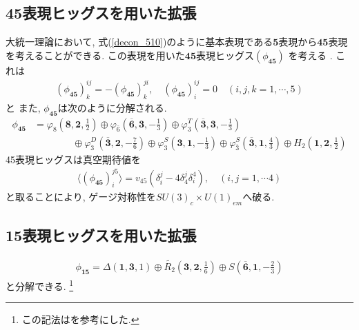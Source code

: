 \subsection{45表現ヒッグスを用いた拡張}
大統一理論において, 式(\ref{decon_510})のように基本表現である$\bm{5}$表現から$\bm{45}$表現を考えることができる.
この表現を用いた$\bm{45}$表現ヒッグス$(\phi_{\bm{45}})$ を考える
\cite{framptonEstimateFlavorNumber1979,georgiNewLeptonquarkMass1979}.
これは
\begin{align}
  \left(\phi_{\bm{45}}\right)^{ij}_k = -(\phi_{\bm{45}})^{ji}_k,\quad (\phi_{\bm{45}})^{ij}_i =0 \quad(i,j,k =1,\cdots,5)\nonumber
\end{align}
と
また, $\phi_{\bm{45}}$は次のように分解される.
\begin{align}
  \phi_{\bm{45}} &= \varphi_8 \left(\bm{8}, \bm{2}, \frac{1}{2}\right) \oplus \varphi_{\bar{6}}\left(\overline{\bm{6}}, \bm{3}, -\frac{1}{3}\right) \oplus \varphi_3^T\left(\overline{\bm{3}}, \bm{3}, -\frac{1}{3}\right) \nonumber\\
                 &\qquad\qquad\oplus \varphi_3^D\left( \overline{\bm{3}}, \bm{2}, -\frac{7}{6}\right) \oplus \varphi_3^S\left(\bm{3}, \bm{1}, -\frac{1}{3}\right)\oplus \varphi_{\overline{3}}^S\left( \overline{\bm{3}}, \bm{1}, \frac{4}{3}\right)\oplus H_2\left(\bm{1}, \bm{2}, \frac{1}{2}\right)\nonumber
\end{align}
45表現ヒッグスは真空期待値を
\begin{align}
  \langle (\phi_{\bm{45}})^{j5}_i\rangle = v_{45}\left(\delta^j_i - 4\delta^j_4 \delta_i^4\right),\quad(i,j=1,\cdots 4)
\end{align}
と取ることにより, ゲージ対称性を$SU(3)_c\times U(1)_{em}$へ破る.
\subsection{15表現ヒッグスを用いた拡張}
\begin{align}
  \phi_{\bm{15}} = \Delta \left(\bm{1}, \bm{3}, 1\right) \oplus \widetilde{R_2}\left(\bm{3}, \bm{2},\frac{1}{6}\right)\oplus S\left(\overline{\bm{6}}, \bm{1}, -\frac{2}{3}\right)
\end{align}
と分解できる.
\footnote{
  この記法は\cite{dorsnerPhysicsLeptoquarksPrecision2016}を参考にした.
}
